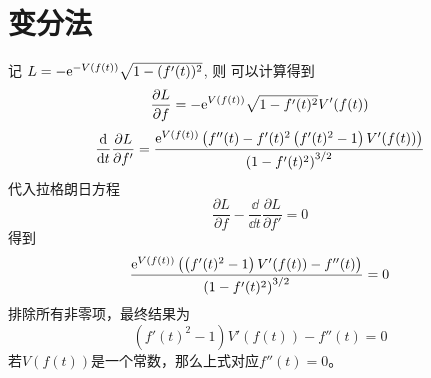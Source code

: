 \chapter{变分法}
\begin{solution}
    记 $L = -\mathrm e^{-V(f(t))} \sqrt{1-(f'(t))^2}$, 则
    可以计算得到
    \[\dfrac{\partial L}{\partial f}=-\mathrm e^{V(f(t))} \sqrt{1-f'(t)^2} V'(f(t))\]
    \[\dfrac{\dd }{\dd t}\dfrac{\partial L}{\partial f'}=\frac{\mathrm e^{V(f(t))} \left(f''(t)-f'(t)^2 \left(f'(t)^2-1\right) V'(f(t))\right)}{\left(1-f'(t)^2\right)^{3/2}}\]
    代入拉格朗日方程
    \[\dfrac{\partial L}{\partial f}-\dfrac{\dd }{\dd t}\dfrac{\partial L}{\partial f'}=0\]
    得到
    \[\frac{\mathrm e^{V(f(t))} \left(\left(f'(t)^2-1\right) V'(f(t))-f''(t)\right)}{\left(1-f'(t)^2\right)^{3/2}}=0\]
    排除所有非零项，最终结果为
    \[\left(f'(t)^2-1\right) V'(f(t))-f''(t)=0\]
    若\(V(f(t))\)是一个常数，那么上式对应\(f''(t)=0\)。
\end{solution}

